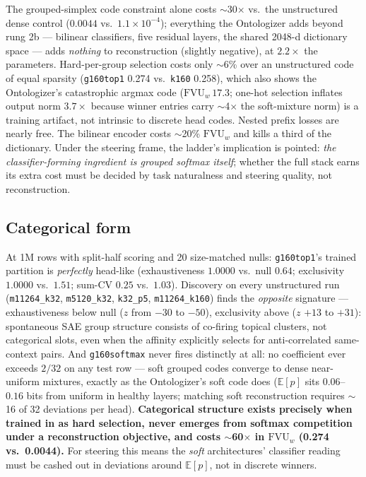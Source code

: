 \documentclass[11pt]{article}
\newcommand{\fvu}{\mathrm{FVU}_w}
\begin{document}
The grouped-simplex code constraint alone costs $\sim$30$\times$ vs.\ the
unstructured dense control ($0.0044$ vs.\ $1.1\times10^{-4}$); everything
the Ontologizer adds beyond rung 2b --- bilinear classifiers, five
residual layers, the shared 2048-d dictionary space --- adds \emph{nothing}
to reconstruction (slightly negative), at $2.2\times$ the parameters.
Hard-per-group selection costs only $\sim$6\% over an unstructured code of
equal sparsity (\texttt{g160top1} 0.274 vs.\ \texttt{k160} 0.258), which
also shows the Ontologizer's catastrophic argmax code ($\fvu\,17.3$;
one-hot selection inflates output norm $3.7\times$ because winner entries
carry $\sim$4$\times$ the soft-mixture norm) is a training artifact, not
intrinsic to discrete head codes. Nested prefix losses are nearly free.
The bilinear encoder costs $\sim$20\% $\fvu$ and kills a third of the
dictionary. Under the steering frame, the ladder's implication is
pointed: \emph{the classifier-forming ingredient is grouped softmax
itself}; whether the full stack earns its extra cost must be decided by
task naturalness and steering quality, not reconstruction.

\subsection{Categorical form}

At 1M rows with split-half scoring and 20 size-matched nulls:
\texttt{g160top1}'s trained partition is \emph{perfectly} head-like
(exhaustiveness $1.0000$ vs.\ null $0.64$; exclusivity $1.0000$ vs.\
$1.51$; sum-CV $0.25$ vs.\ $1.03$). Discovery on every unstructured run
(\texttt{m11264\_k32}, \texttt{m5120\_k32}, \texttt{k32\_p5},
\texttt{m11264\_k160}) finds the \emph{opposite} signature ---
exhaustiveness below null ($z$ from $-30$ to $-50$), exclusivity above
($z$ $+13$ to $+31$): spontaneous SAE group structure consists of
co-firing topical clusters, not categorical slots, even when the affinity
explicitly selects for anti-correlated same-context pairs. And
\texttt{g160softmax} never fires distinctly at all: no coefficient ever
exceeds $2/32$ on any test row --- soft grouped codes converge to dense
near-uniform mixtures, exactly as the Ontologizer's soft code does
($\mathbb{E}[p]$ sits $0.06$--$0.16$ bits from uniform in healthy layers;
matching soft reconstruction requires $\sim$16 of 32 deviations per head).
\textbf{Categorical structure exists precisely when trained in as hard
selection, never emerges from softmax competition under a reconstruction
objective, and costs $\sim$60$\times$ in $\fvu$ (0.274 vs.\ 0.0044).}
For steering this means the \emph{soft} architectures' classifier reading
must be cashed out in deviations around $\mathbb{E}[p]$, not in discrete
winners.
\end{document}
